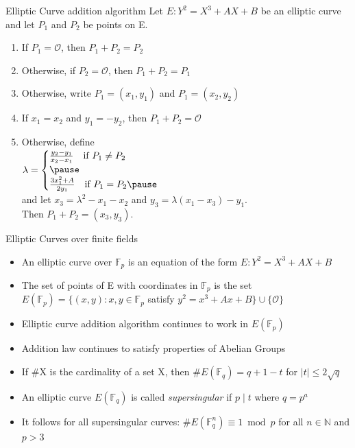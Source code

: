 \documentclass{beamer}
\begin{document}
\begin{frame}{Elliptic Curve addition algorithm}
	Let $E : Y^2 = X^3 + AX + B$ be an elliptic curve and let $P_1$ and $P_2$ be points on E.
	\begin{enumerate}[1.]
		\item If $P_1 = \mathcal{O}$, then $P_1 + P_2 = P_2$\pause
		\item Otherwise, if $P_2=\mathcal{O}$, then $P_1 + P_2 = P_1$\pause
		\item Otherwise, write $P_1 = (x_1,y_1)$ and $P_1 = (x_2,y_2)$\pause
		\item If $x_1 = x_2$ and $y_1=-y_2$, then $P_1+P_2=\mathcal{O}$\pause
		\item Otherwise, define \\
		\qquad \qquad \qquad$\lambda =
		\begin{cases}
			\frac{y_2-y_1}{x_2-x_1}\text{\quad if }P_1 \neq P_2\\\pause
			\\
			\frac{3x_1^2 +A}{2y_1}\text{\quad if }P_1=P_2 \pause
		\end{cases}$\\
		\vspace{5mm}
		and let $x_3=\lambda^2-x_1-x_2$  \hfill and $y_3=\lambda(x_1-x_3)-y_1$.\\
		\vfill
		Then $P_1+P_2=(x_3,y_3)$.
	\end{enumerate}
\end{frame}


\begin{frame}{Elliptic Curves over finite fields}
	\begin{itemize}[\textbullet]
		\item An elliptic curve over $\mathbb{F}_p$ is an equation of the form $E:Y^2=X^3+AX+B$
		\item The set of points of E with coordinates in $\mathbb{F}_p$ is the set $E(\mathbb{F}_p)=\{(x,y):x,y\in \mathbb{F}_p$ satisfy $y^2=x^3+Ax+B \} \cup \{\mathcal{O}\}$
		\item Elliptic curve addition algorithm continues to work in $E(\mathbb{F}_p)$
		\item Addition law continues to satisfy properties of Abelian Groups
		\item If \#X is the cardinality of a set X, then \#$E(\mathbb{F}_q) = q+1-t$ for $|t|\leq 2\sqrt{q}$
		\item An elliptic curve $E(\mathbb{F}_q)$ is called \textit{supersingular} if $p \mid t$ where $q=p^a$
		\item It follows for all supersingular curves: $\#E(\mathbb{F}_q^n)\equiv 1 \bmod p$ for all $n\in \mathbb{N}$ and $p>3$
	\end{itemize}
	
\end{frame}
\end{document}
